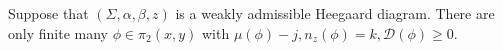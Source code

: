 

    Suppose that $(\Sigma, \alpha, \beta, z)$ is a weakly admissible Heegaard diagram. There are only finite many $\phi\in \pi_2(x, y)$ with $\mu(\phi)-j, n_z(\phi)=k, \mathcal D(\phi)\geq 0$.
